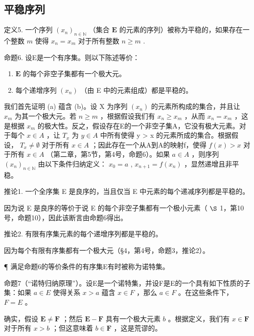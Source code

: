 \subsection{平稳序列}

定义5. 一个序列 \((x_{n})_{n\in \mathbb{N}}\) （集合 \(\mathbf{E}\) 的元素的序列）被称为平稳的，如果存在一个整数 \(m\) 使得 \(x_{n} = x_{m}\) 对于所有整数 \(n\geqslant m\) .

命题6. 设E是一个有序集。则以下陈述等价：

\begin{enumerate}
\def\labelenumi{(\alph{enumi})}
\item
  \(\mathbf{E}\) 的每个非空子集都有一个极大元。
\item
  每个递增序列 \((x_{n})\) （由 E 中的元素组成）都是平稳的。
\end{enumerate}

我们首先证明 (a) 蕴含 (b)。设 X 为序列 \((x_{n})\) 的元素所构成的集合，并且让 \(x_{m}\) 为其一个极大元。若 \(n \geqslant m\) ，根据假设我们有 \(x_{n} \geqslant x_{m}\) ，从而 \(x_{n} = x_{m}\) ，这是根据 \(x_{m}\) 的极大性。反之，假设存在E的一个非空子集A，它没有极大元素。对于每个 \(x \in A\) ，让 \(T_{x}\) 为 \(y \in A\) 中所有使得 y \textgreater{} x 的元素所成的集合。根据假设， \(T_{x} \neq \emptyset\) 对于所有 \(x \in A\) ；因此存在一个从A到A的映射f，使得 \(f(x) > x\) 对于所有 \(x \in A\) （第二章，第5节，第4号，命题6）。如果 \(a \in A\) ，则序列 \((x_{n})_{n \in \mathbb{N}}\) 由以下条件归纳定义： \(x_{0} = a\) , \(x_{n+1} = f(x_{n})\) ，显然递增且非平稳。

推论1. 一个全序集 E 是良序的，当且仅当 E 中元素的每个递减序列都是平稳的。

因为说 E 是良序的等价于说 E 的每个非空子集都有一个极小元素（ \(\S\) 1，第10号，命题10），因此该断言由命题6得出。

推论2. 有限有序集元素的每个递增序列都是平稳的。

因为每个有限有序集都有一个极大元（§4，第4号，命题3，推论2）。

¶ 满足命题6的等价条件的有序集E有时被称为诺特集。

命题7（“诺特归纳原理”）。设E是一个诺特集，并设F是E的一个具有如下性质的子集：如果 \(a \in E\) 使得关系 \(x > a\) 蕴含 \(x \in F\) ，那么 \(a \in F\) 。在这些条件下， \(F = E\) 。

确实，假设 \(\mathbf{E} \neq \mathbf{F}\) ；然后 \(\mathbf{E} - \mathbf{F}\) 具有一个极大元素 \(b\) 。根据定义，我们有 \(x \in \mathbf{F}\) 对于所有 \(x > b\) ；但这意味着 \(b \in \mathbf{F}\) ，这是荒谬的。

